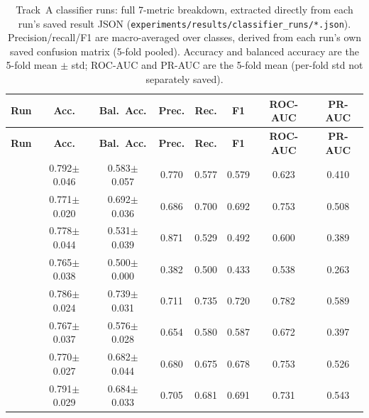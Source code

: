 \begingroup\footnotesize
\setlength{\tabcolsep}{3pt}
\begin{longtable}{L{4.3cm}ccccccc}
\caption{Track~A classifier runs: full 7-metric breakdown, extracted directly from each run's saved result JSON (\texttt{experiments/results/classifier\_runs/*.json}). Precision/recall/F1 are macro-averaged over classes, derived from each run's own saved confusion matrix (5-fold pooled). Accuracy and balanced accuracy are the 5-fold mean $\pm$ std; ROC-AUC and PR-AUC are the 5-fold mean (per-fold std not separately saved).}\label{tab:app-tracka}\\
\toprule
\textbf{Run} & \textbf{Acc.} & \textbf{Bal.\ Acc.} & \textbf{Prec.} & \textbf{Rec.} & \textbf{F1} & \textbf{ROC-AUC} & \textbf{PR-AUC} \\
\midrule
\endfirsthead
\toprule
\textbf{Run} & \textbf{Acc.} & \textbf{Bal.\ Acc.} & \textbf{Prec.} & \textbf{Rec.} & \textbf{F1} & \textbf{ROC-AUC} & \textbf{PR-AUC} \\
\midrule
\endhead
\texttt{\scriptsize {}} & 0.792$\pm$0.046 & 0.583$\pm$0.057 & 0.770 & 0.577 & 0.579 & 0.623 & 0.410 \\
\texttt{\scriptsize {}} & 0.771$\pm$0.020 & 0.692$\pm$0.036 & 0.686 & 0.700 & 0.692 & 0.753 & 0.508 \\
\texttt{\scriptsize {}} & 0.778$\pm$0.044 & 0.531$\pm$0.039 & 0.871 & 0.529 & 0.492 & 0.600 & 0.389 \\
\texttt{\scriptsize {}} & 0.765$\pm$0.038 & 0.500$\pm$0.000 & 0.382 & 0.500 & 0.433 & 0.538 & 0.263 \\
\texttt{\scriptsize {}} & 0.786$\pm$0.024 & 0.739$\pm$0.031 & 0.711 & 0.735 & 0.720 & 0.782 & 0.589 \\
\texttt{\scriptsize {}} & 0.767$\pm$0.037 & 0.576$\pm$0.028 & 0.654 & 0.580 & 0.587 & 0.672 & 0.397 \\
\texttt{\scriptsize {}} & 0.770$\pm$0.027 & 0.682$\pm$0.044 & 0.680 & 0.675 & 0.678 & 0.753 & 0.526 \\
\texttt{\scriptsize {}} & 0.791$\pm$0.029 & 0.684$\pm$0.033 & 0.705 & 0.681 & 0.691 & 0.731 & 0.543 \\

\end{longtable}
